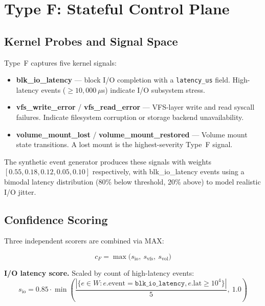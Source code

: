 \documentclass[runningheads]{llncs}
\begin{document}
\section{Type F: Stateful Control Plane}
\label{sec:typeF}

\subsection{Kernel Probes and Signal Space}

Type~F captures five kernel signals:

\begin{itemize}
  \item \textbf{blk\_io\_latency} --- block I/O completion with a
    \texttt{latency\_us} field.  High-latency events ($\geq 10{,}000~\mu$s)
    indicate I/O subsystem stress.
  \item \textbf{vfs\_write\_error} / \textbf{vfs\_read\_error} ---
    VFS-layer write and read syscall failures.  Indicate filesystem
    corruption or storage backend unavailability.
  \item \textbf{volume\_mount\_lost} / \textbf{volume\_mount\_restored} ---
    Volume mount state transitions.  A lost mount is the highest-severity
    Type~F signal.
\end{itemize}

The synthetic event generator produces these signals with weights
$[0.55, 0.18, 0.12, 0.05, 0.10]$ respectively, with blk\_io\_latency
events using a bimodal latency distribution (80\% below threshold,
20\% above) to model realistic I/O jitter.

\subsection{Confidence Scoring}

Three independent scorers are combined via MAX:

\begin{equation}
  c_F = \max\bigl(s_\text{io},\ s_\text{vfs},\ s_\text{vol}\bigr)
  \label{eq:score_f}
\end{equation}

\noindent\textbf{I/O latency score.}  Scaled by count of high-latency events:
\begin{equation}
  s_\text{io} = 0.85 \cdot \min\!\left(
    \frac{|\{e \in W : e.\text{event}=\texttt{blk\_io\_latency},
      e.\text{lat} \geq 10^4\}|}{5},\ 1.0\right)
  \label{eq:score_io}
\end{equation}
\end{document}
